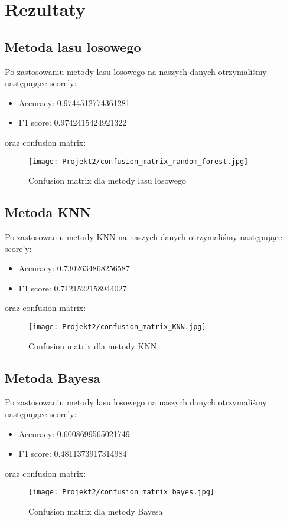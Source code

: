 \documentclass{article}
\begin{document}
\section{Rezultaty}
\subsection{Metoda lasu losowego}
Po zastosowaniu metody lasu losowego na naszych danych otrzymaliśmy następujące score'y:

\begin{itemize}
    \item Accuracy: 0.9744512774361281
    \item F1 score: 0.9742415424921322
\end{itemize}
oraz confusion matrix:
\begin{figure}[H]
    \centering
    \texttt{[image: Projekt2/confusion\_matrix\_random\_forest.jpg]}
    \caption{Confusion matrix dla metody lasu losowego}
    \label{fig:enter-label}
\end{figure}

\subsection{Metoda KNN}
Po zastosowaniu metody KNN na naszych danych otrzymaliśmy następujące score'y:

\begin{itemize}
    \item Accuracy: 0.7302634868256587
    \item F1 score: 0.7121522158944027
\end{itemize}
oraz confusion matrix:
\begin{figure}[H]
    \centering
    \texttt{[image: Projekt2/confusion\_matrix\_KNN.jpg]}
    \caption{Confusion matrix dla metody KNN}
    \label{fig:enter-label}
\end{figure}

\subsection{Metoda Bayesa}
Po zastosowaniu metody lasu losowego na naszych danych otrzymaliśmy następujące score'y:

\begin{itemize}
    \item Accuracy: 0.6008699565021749
    \item F1 score: 0.4811373917314984
\end{itemize}
oraz confusion matrix:
\begin{figure}[H]
    \centering
    \texttt{[image: Projekt2/confusion\_matrix\_bayes.jpg]}
    \caption{Confusion matrix dla metody Bayesa}
    \label{fig:enter-label}
\end{figure}
\end{document}
